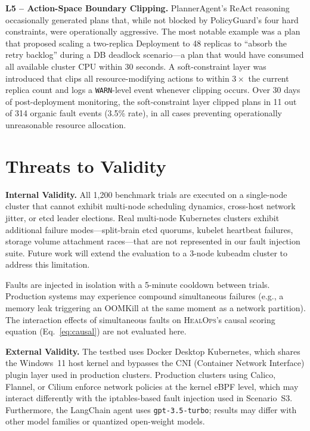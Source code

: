 \documentclass[journal,10pt,twoside]{IEEEtran}
\newcommand{\HealOps}{\textsc{HealOps}}
\begin{document}
\textbf{L5 -- Action-Space Boundary Clipping.}
PlannerAgent's ReAct reasoning occasionally generated plans that, while
not blocked by PolicyGuard's four hard constraints, were operationally
aggressive. The most notable example was a plan that proposed scaling a
two-replica Deployment to 48 replicas to ``absorb the retry backlog''
during a DB deadlock scenario---a plan that would have consumed all
available cluster CPU within 30 seconds. A soft-constraint layer was
introduced that clips all resource-modifying actions to within $3\times$
the current replica count and logs a \texttt{WARN}-level event whenever
clipping occurs. Over 30 days of post-deployment monitoring, the
soft-constraint layer clipped plans in 11 out of 314 organic fault
events (3.5\% rate), in all cases preventing operationally
unreasonable resource allocation.

\section{Threats to Validity}\label{sec:threats}

\textbf{Internal Validity.}
All 1{,}200 benchmark trials are executed on a single-node cluster that
cannot exhibit multi-node scheduling dynamics, cross-host network jitter,
or etcd leader elections. Real multi-node Kubernetes clusters exhibit
additional failure modes---split-brain etcd quorums, kubelet heartbeat
failures, storage volume attachment races---that are not represented in
our fault injection suite. Future work will extend the evaluation to
a 3-node kubeadm cluster to address this limitation.

Faults are injected in isolation with a 5-minute cooldown between trials.
Production systems may experience compound simultaneous failures (e.g., a
memory leak triggering an OOMKill at the same moment as a network
partition). The interaction effects of simultaneous faults on \HealOps{}'s
causal scoring equation (Eq.~\ref{eq:causal}) are not evaluated here.

\textbf{External Validity.}
The testbed uses Docker Desktop Kubernetes, which shares the Windows~11
host kernel and bypasses the CNI (Container Network Interface) plugin
layer used in production clusters. Production clusters using Calico,
Flannel, or Cilium enforce network policies at the kernel eBPF level,
which may interact differently with the iptables-based fault injection
used in Scenario~S3. Furthermore, the LangChain agent uses
\texttt{gpt-3.5-turbo}; results may differ with other model families
or quantized open-weight models.
\end{document}

